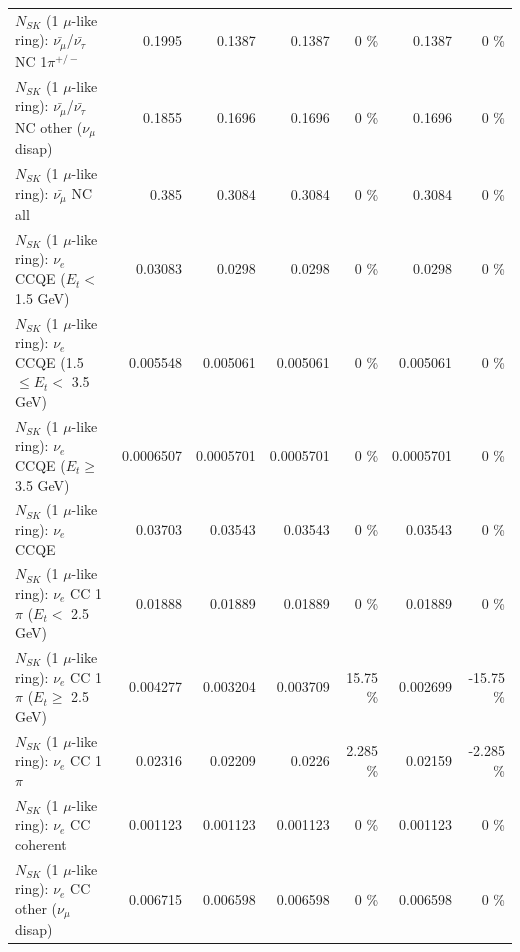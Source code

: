 \begin{table}
\begin{tabular}{| l | r | r | r  r | r  r |}
\hline
  $N_{SK}$ (1 $\mu$-like ring): $\bar{\nu_\mu}$/$\bar{\nu_\tau}$ NC 1$\pi^{+/-}$ &          0.1995 &          0.1387 &          0.1387 &        0 \%  &          0.1387 &        0 \%  \\ 
$N_{SK}$ (1 $\mu$-like ring): $\bar{\nu_\mu}$/$\bar{\nu_\tau}$ NC other ($\nu_\mu$ disap) &          0.1855 &          0.1696 &          0.1696 &        0 \%  &          0.1696 &        0 \%  \\ 
                          $N_{SK}$ (1 $\mu$-like ring): $\bar{\nu_{\mu}}$ NC all &           0.385 &          0.3084 &          0.3084 &        0 \%  &          0.3084 &        0 \%  \\ 
\hline
\hline
\hline
                  $N_{SK}$ (1 $\mu$-like ring): $\nu_e$ CCQE ($E_{t} <$ 1.5 GeV) &         0.03083 &          0.0298 &          0.0298 &        0 \%  &          0.0298 &        0 \%  \\ 
         $N_{SK}$ (1 $\mu$-like ring): $\nu_e$ CCQE (1.5 $\leq E_{t} <$ 3.5 GeV) &        0.005548 &        0.005061 &        0.005061 &        0 \%  &        0.005061 &        0 \%  \\ 
               $N_{SK}$ (1 $\mu$-like ring): $\nu_e$ CCQE ($E_{t} \geq$ 3.5 GeV) &       0.0006507 &       0.0005701 &       0.0005701 &        0 \%  &       0.0005701 &        0 \%  \\ 
\hline
                                      $N_{SK}$ (1 $\mu$-like ring): $\nu_e$ CCQE &         0.03703 &         0.03543 &         0.03543 &        0 \%  &         0.03543 &        0 \%  \\ 
\hline
             $N_{SK}$ (1 $\mu$-like ring): $\nu_e$ CC 1$\pi$ ($E_{t} <$ 2.5 GeV) &         0.01888 &         0.01889 &         0.01889 &        0 \%  &         0.01889 &        0 \%  \\ 
          $N_{SK}$ (1 $\mu$-like ring): $\nu_e$ CC 1$\pi$ ($E_{t} \geq$ 2.5 GeV) &        0.004277 &        0.003204 &        0.003709 &    15.75 \%  &        0.002699 &   -15.75 \%  \\ 
\hline
                                 $N_{SK}$ (1 $\mu$-like ring): $\nu_e$ CC 1$\pi$ &         0.02316 &         0.02209 &          0.0226 &    2.285 \%  &         0.02159 &   -2.285 \%  \\ 
                               $N_{SK}$ (1 $\mu$-like ring): $\nu_e$ CC coherent &        0.001123 &        0.001123 &        0.001123 &        0 \%  &        0.001123 &        0 \%  \\ 
                $N_{SK}$ (1 $\mu$-like ring): $\nu_e$ CC other ($\nu_\mu$ disap) &        0.006715 &        0.006598 &        0.006598 &        0 \%  &        0.006598 &        0 \%  \\ 

\end{tabular}
\end{table}
